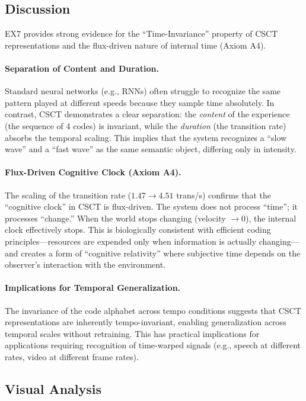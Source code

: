 \documentclass{article}
\begin{document}
\subsection{Discussion}

EX7 provides strong evidence for the ``Time-Invariance'' property of CSCT representations and the flux-driven nature of internal time (Axiom A4).

\paragraph{Separation of Content and Duration.}
Standard neural networks (e.g., RNNs) often struggle to recognize the same pattern played at different speeds because they sample time absolutely. In contrast, CSCT demonstrates a clear separation: the \textit{content} of the experience (the sequence of 4 codes) is invariant, while the \textit{duration} (the transition rate) absorbs the temporal scaling. This implies that the system recognizes a ``slow wave'' and a ``fast wave'' as the same semantic object, differing only in intensity.

\paragraph{Flux-Driven Cognitive Clock (Axiom A4).}
The scaling of the transition rate ($1.47 \to 4.51$ trans/s) confirms that the ``cognitive clock'' in CSCT is flux-driven. The system does not process ``time''; it processes ``change.'' When the world stops changing (velocity $\to 0$), the internal clock effectively stops. This is biologically consistent with efficient coding principles---resources are expended only when information is actually changing---and creates a form of ``cognitive relativity'' where subjective time depends on the observer's interaction with the environment.

\paragraph{Implications for Temporal Generalization.}
The invariance of the code alphabet across tempo conditions suggests that CSCT representations are inherently tempo-invariant, enabling generalization across temporal scales without retraining. This has practical implications for applications requiring recognition of time-warped signals (e.g., speech at different rates, video at different frame rates).

\subsection{Visual Analysis}
\end{document}
